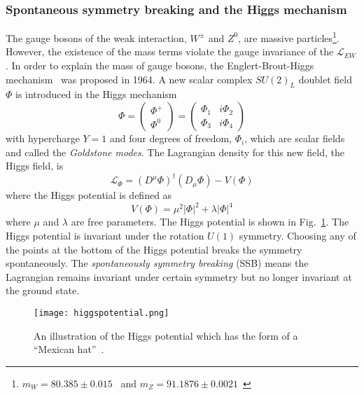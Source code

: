 \subsubsection{Spontaneous symmetry breaking and the Higgs mechanism}
\label{subsubsec:sm_Higgs_mechanism}
The gauge bosons of the weak interaction, $W^{\pm}$ and $Z^{0}$, are massive particles\footnote{$m_{W}=80.385 \pm 0.015$~{\GeV} and $m_{Z}=91.1876 \pm 0.0021$~{\GeV}}.
However, the existence of the mass terms violate the gauge invariance of the $\mathcal{L}_{EW}$.
In order to explain the mass of gauge bosons, the Englert-Brout-Higgs mechanism~\cite{Higgs:1966ev, Higgs:1964pj, Higgs:1964ia, Englert:1964et, Guralnik:1964eu} was proposed in 1964.
A new scalar complex $SU(2)_{L}$ doublet field $\Phi$ is introduced in the Higgs mechanism
%
\begin{equation}
    \Phi = \left(\begin{matrix}\Phi^{+}\\\Phi^{0}\end{matrix}\right) = \left(\begin{matrix}\Phi_{1} & i\Phi_{2}\\\Phi_{3} & i\Phi_{4}\end{matrix}\right)
    \label{eq:sm_higgs_doublet}
\end{equation}
%
with hypercharge $Y = 1$ and four degrees of freedom, $\Phi_{i}$, which are scalar fields and called the \textit{Goldstone modes}.
The Lagrangian density for this new field, the Higgs field, is
%
\begin{equation}
    \mathcal{L}_{\Phi} = (D^{\mu}\Phi)^{\dagger}(D_{\mu}\Phi) - V(\Phi)
    \label{eq:sm_higgs_lagrangian}
\end{equation}
%
where the Higgs potential is defined as
%
\begin{equation}
    V(\Phi) = \mu^{2}|\Phi|^{2} + \lambda|\Phi|^{4}
    \label{eq:sm_higgs_potential}
\end{equation}
%
where $\mu$ and $\lambda$ are free parameters.
The Higgs potential is shown in Fig.~\ref{fig:sm_higgs_potential}.
The Higgs potential is invariant under the rotation $U(1)$ symmetry.
Choosing any of the points at the bottom of the Higgs potential breaks the symmetry spontaneously.
The \textit{spontaneously symmetry breaking} (SSB) means the Lagrangian remains invariant under certain symmetry but no longer invariant at the ground state.

\begin{figure}[htbp]
    \begin{center}
        \texttt{[image: higgspotential.png]}
        \caption{An illustration of the Higgs potential which has the form of a ``Mexican hat''~\cite{Ellis:2013jnq}.}
        \label{fig:sm_higgs_potential}
    \end{center}
\end{figure}

